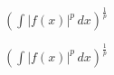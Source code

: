 \documentclass{article}
\begin{document}
    $\left(\int \left|{f{\left(x \right)}}\right|^{p}\, dx\right)^{\frac{1}{p}}$

    $\left(\int \left|{f{\left(x \right)}}\right|^{p}\, dx\right)^{\frac{1}{p}}$
\end{document}
